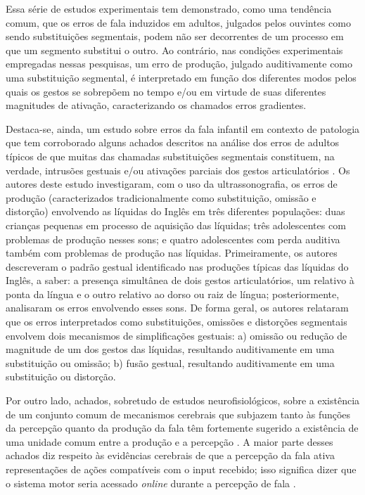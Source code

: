 \documentclass[output=paper,colorlinks,citecolor=brown,booklanguage=portuguese]{langscibook}
\begin{document}
Essa série de estudos experimentais tem demonstrado, como uma tendência comum, que os erros de fala induzidos em adultos, julgados pelos ouvintes como sendo substituições segmentais, podem não ser decorrentes de um processo em que um segmento substitui o outro. Ao contrário, nas condições experimentais empregadas nessas pesquisas, um erro de produção, julgado auditivamente como uma substituição segmental, é interpretado em função dos diferentes modos pelos quais os gestos se sobrepõem no tempo e/ou em virtude de suas diferentes magnitudes de ativação, caracterizando os chamados erros gradientes.

Destaca-se, ainda, um estudo sobre erros da fala infantil em contexto de patologia que tem corroborado alguns achados descritos na análise dos erros de adultos típicos de que muitas das chamadas substituições segmentais constituem, na verdade, intrusões gestuais e/ou ativações parciais dos gestos articulatórios \citep{Gick2007}. Os autores deste estudo investigaram, com o uso da ultrassonografia,  os erros de produção (caracterizados tradicionalmente como substituição, omissão e distorção) envolvendo as líquidas do Inglês em três diferentes populações: duas crianças pequenas em processo de aquisição das líquidas; três adolescentes com problemas de produção nesses sons; e quatro adolescentes com perda auditiva também com problemas de produção nas líquidas. Primeiramente, os autores descreveram o padrão gestual identificado nas produções típicas das líquidas do Inglês, a saber: a presença simultânea de dois gestos articulatórios, um relativo à ponta da língua e o outro relativo ao dorso ou raiz de língua; posteriormente, analisaram os erros envolvendo esses sons. De forma geral, os autores relataram que os erros interpretados como substituições, omissões e distorções segmentais envolvem dois mecanismos de simplificações gestuais: a) omissão ou redução de magnitude de um dos gestos das líquidas, resultando auditivamente em uma substituição ou omissão; b) fusão gestual, resultando auditivamente em uma substituição ou distorção.

Por outro lado, achados, sobretudo de estudos neurofisiológicos, sobre a existência de um conjunto comum de mecanismos cerebrais que subjazem tanto às funções da percepção quanto da produção da fala têm fortemente sugerido a existência de uma unidade comum entre a produção e a percepção \citep{Rizzolatti1998, Rizzolatti2004, Galantucci2006, Gentilucci2006, Pulvermueller2006}. A maior parte desses achados diz respeito às evidências cerebrais de que a percepção da fala ativa representações de ações compatíveis com o input recebido; isso significa dizer que o sistema motor seria acessado \emph{online} durante a percepção de fala \citep{Galantucci2006}.
\end{document}
